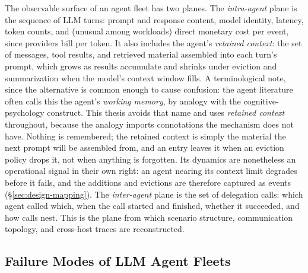 The observable surface of an agent fleet has two planes. The
\emph{intra-agent} plane is the sequence of LLM turns: prompt and response
content, model identity, latency, token counts, and (unusual among
workloads) direct monetary cost per event, since providers bill per token.
It also includes the agent's \emph{retained context}: the set of messages,
tool results, and retrieved material assembled into each turn's prompt,
which grows as results accumulate and shrinks under eviction and
summarization when the model's context window fills. A terminological note,
since the alternative is common enough to cause confusion: the agent
literature often calls this the agent's \emph{working memory}, by analogy
with the cognitive-psychology construct. This thesis avoids that name and
uses \emph{retained context} throughout, because the analogy imports
connotations the mechanism does not have. Nothing is remembered; the
retained context is simply the material the next prompt will be assembled
from, and an entry leaves it when an eviction policy drops it, not when
anything is forgotten. Its dynamics are nonetheless an operational signal in
their own right: an agent nearing its context limit degrades before it
fails, and the additions and evictions are therefore captured as events
(\S\ref{sec:design-mapping}). The \emph{inter-agent} plane is the set of
delegation calls: which agent called which, when the call started and
finished, whether it succeeded, and how calls nest. This is the plane from
which scenario structure, communication topology, and cross-host traces are
reconstructed.

\subsection{Failure Modes of LLM Agent Fleets}
\label{sec:bg-agent-failures}

